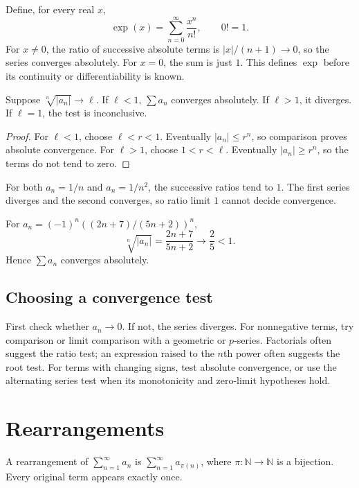 \begin{example}\label{ex:analysis-exp}
Define, for every real $x$,
\[
\exp(x)=\sum_{n=0}^{\infty}\frac{x^n}{n!},\qquad 0!=1.
\]
For $x\ne0$, the ratio of successive absolute terms is $|x|/(n+1)\to0$,
so the series converges absolutely. For $x=0$, the sum is just $1$.
This defines $\exp$ before its continuity or differentiability is known.
\end{example}

\begin{theorem}
Suppose $\sqrt[n]{|a_n|}\to\ell$. If $\ell<1$, $\sum a_n$ converges
absolutely. If $\ell>1$, it diverges. If $\ell=1$, the test is inconclusive.
\end{theorem}
\begin{proof}
For $\ell<1$, choose $\ell<r<1$. Eventually $|a_n|\leq r^n$, so comparison
proves absolute convergence. For $\ell>1$, choose $1<r<\ell$.
Eventually $|a_n|\geq r^n$, so the terms do not tend to zero.
\end{proof}

\begin{example}
For both $a_n=1/n$ and $a_n=1/n^2$, the successive ratios tend to $1$.
The first series diverges and the second converges, so ratio limit $1$
cannot decide convergence.
\end{example}
\begin{example}
For $a_n=(-1)^n((2n+7)/(5n+2))^n$,
\[
\sqrt[n]{|a_n|}=\frac{2n+7}{5n+2}\longrightarrow\frac25<1.
\]
Hence $\sum a_n$ converges absolutely.
\end{example}

\subsection{Choosing a convergence test}
First check whether $a_n\to0$. If not, the series diverges.
For nonnegative terms, try comparison or limit comparison with a geometric
or $p$-series. Factorials often suggest the ratio test; an expression raised
to the $n$th power often suggests the root test. For terms with changing
signs, test absolute convergence, or use the alternating series test when
its monotonicity and zero-limit hypotheses hold.

\section{Rearrangements}
\begin{definition}
A rearrangement of $\sum_{n=1}^{\infty}a_n$ is
$\sum_{n=1}^{\infty}a_{\pi(n)}$, where
$\pi:\mathbb N\to\mathbb N$ is a bijection. Every original term appears
exactly once.
\end{definition}

